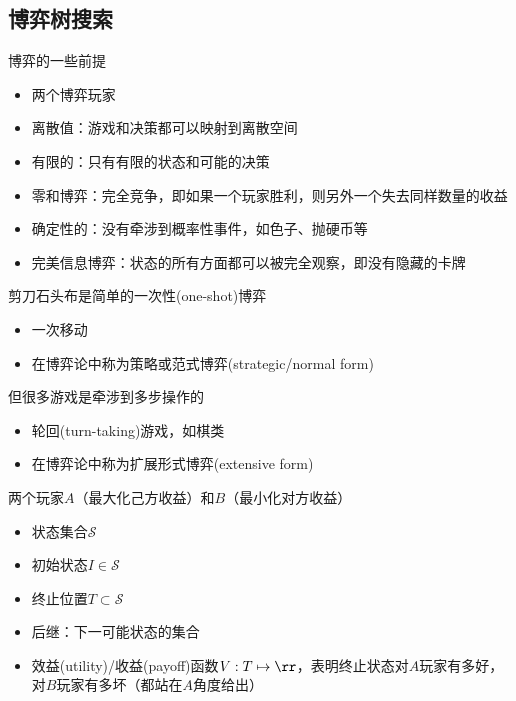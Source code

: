 
\subsection{博弈树搜索}

博弈的一些前提
\begin{itemize}
	\item 两个博弈玩家
	\item 离散值：游戏和决策都可以映射到离散空间
	\item 有限的：只有有限的状态和可能的决策
	\item 零和博弈：完全竞争，即如果一个玩家胜利，则另外一个失去同样数量的收益
	\item 确定性的：没有牵涉到概率性事件，如色子、抛硬币等
	\item 完美信息博弈：状态的所有方面都可以被完全观察，即没有隐藏的卡牌
\end{itemize}

剪刀石头布是简单的一次性(one-shot)博弈
\begin{itemize}
	\item 一次移动
	\item 在博弈论中称为策略或范式博弈(strategic/normal form)
\end{itemize}

但很多游戏是牵涉到多步操作的
\begin{itemize}
	\item 轮回(turn-taking)游戏，如棋类
	\item 在博弈论中称为扩展形式博弈(extensive form)
\end{itemize}

两个玩家$A$（最大化己方收益）和$B$（最小化对方收益）
\begin{itemize}
	\item 状态集合$\mathcal{S}$
	\item 初始状态$I\in\mathcal{S}$
	\item 终止位置$T\subset\mathcal{S}$
	\item 后继：下一可能状态的集合
	\item 效益(utility)/收益(payoff)函数$V:T\mapsto\rr$，表明终止状态对$A$玩家有多好，对$B$玩家有多坏（都站在$A$角度给出）
\end{itemize}

